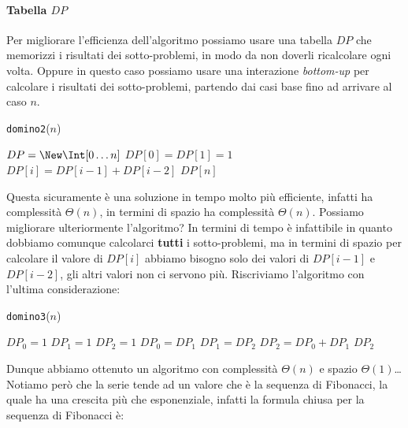             \paragraph{Tabella $DP$} Per migliorare l'efficienza dell'algoritmo possiamo usare una tabella $DP$ che memorizzi i risultati dei sotto-problemi, in modo da non doverli ricalcolare ogni volta. Oppure in questo caso possiamo usare una interazione \textit{bottom-up} per calcolare i risultati dei sotto-problemi, partendo dai casi base fino ad arrivare al caso $n$.
            \begin{algorithm}[H]
                \caption{\Int \texttt{domino2}(\Int $n$)}
                \begin{algorithmic}
                    \State $DP = \New \Int[0 \ldots n]$
                    \State $DP[0] = DP[1] = 1$
                        \State $DP[i] = DP[i-1] + DP[i-2]$
                    \EndFor
                    \State \Return $DP[n]$
                \end{algorithmic}
            \end{algorithm}
            Questa sicuramente è una soluzione in tempo molto più efficiente, infatti ha complessità $\Theta(n)$, in termini di spazio ha complessità $\Theta(n)$.\newline
            Possiamo migliorare ulteriormente l'algoritmo? In termini di tempo è infattibile in quanto dobbiamo comunque calcolarci \textbf{tutti} i sotto-problemi, ma in termini di spazio per calcolare il valore di $DP[i]$ abbiamo bisogno solo dei valori di $DP[i-1]$ e $DP[i-2]$, gli altri valori non ci servono più.
            Riscriviamo l'algoritmo con l'ultima considerazione:
            \begin{algorithm}[H]
                \caption{\Int \texttt{domino3}(\Int $n$)}
                \begin{algorithmic}
                    \State \Int $DP_0 = 1$
                    \State \Int $DP_1 = 1$
                    \State \Int $DP_2 = 1$
                        \State $DP_0 = DP_1$
                        \State $DP_1 = DP_2$
                        \State $DP_2 = DP_0 + DP_1$
                    \EndFor
                    \State \Return $DP_2$
                \end{algorithmic}
            \end{algorithm}
            Dunque abbiamo ottenuto un algoritmo con complessità $\Theta(n)$ e spazio $\Theta(1)$\dots
            Notiamo però che la serie tende ad un valore che è la sequenza di Fibonacci, la quale ha una crescita più che esponenziale, infatti la formula chiusa per la sequenza di Fibonacci è:
